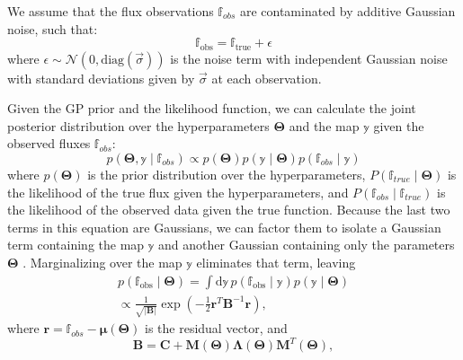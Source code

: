 \documentclass[twocolumn]{aastex631}
\begin{document}
We assume that the flux observations $\mathbb{f}_{obs}$ are contaminated by
additive Gaussian noise, such that:
\begin{equation}
    \mathbb{f}_\mathrm{obs} = \mathbb{f}_\mathrm{true} + \epsilon
\end{equation}
where $\epsilon \sim \mathcal{N}\left(0, \mathrm{diag}\left( \vec{\sigma}
\right)\right)$ is the noise term with independent Gaussian noise with standard
deviations given by $\vec{\sigma}$ at each observation. 

Given the GP prior and the likelihood function, we can calculate the joint
posterior distribution over the hyperparameters $\pmb{\Theta}$ and the map
$\mathbb{y}$ given the observed fluxes $\mathbb{f}_{obs}$:
%
\begin{equation}
    p\left(\pmb{\Theta}, \mathbb{y} \mid \mathbb{f}_{obs}\right) \propto p\left(\pmb{\Theta}\right) p\left(\mathbb{y} \mid \pmb{\Theta}\right) p\left(\mathbb{f}_{obs} \mid \mathbb{y}\right)
\end{equation}
%
where $p\left(\pmb{\Theta}\right)$ is the prior distribution over the
hyperparameters, $P\left(\mathbb{f}_{true} \mid \pmb{\Theta}\right)$ is the
likelihood of the true flux given the hyperparameters, and $P(\mathbb{f}_{obs}
\mid \mathbb{f}_{true})$ is the likelihood of the observed data given the true
function.  Because the last two terms in this equation are Gaussians, we can
factor them to isolate a Gaussian term containing the map $\mathbb{y}$ and
another Gaussian containing only the parameters $\pmb{\Theta}$ \citep[see,
e.g.,][]{Hogg2020}.  Marginalizing over the map $\mathbb{y}$ eliminates that
term, leaving 
\begin{multline}
    \label{eq:log-likeRodrigo}
    p\left( \mathbb{f}_\mathrm{obs} \mid \pmb{\Theta} \right) = \int \mathrm{d} \mathbb{y} \, p\left( \mathbb{f}_\mathrm{obs} \mid \mathbb{y} \right) p\left( \mathbb{y} \mid \pmb{\Theta} \right) \\ \propto \frac{1}{\sqrt{\left| \pmb{B} \right|}} \exp\left( -\frac{1}{2} \mathbf{r}^T \pmb{B}^{-1} \mathbf{r} \right),
\end{multline}
where $\mathbf{r} = \mathbb{f}_{obs} - \pmb{\mu}\left(\pmb{\Theta} \right)$ is
the residual vector, and
\begin{equation}
    \pmb{B} = \pmb{C} + \pmb{M}\left(\pmb{\Theta}\right) \pmb{\Lambda}\left(\pmb{\Theta} \right) \pmb{M}^T\left(\pmb{\Theta}\right),
\end{equation}
\end{document}
